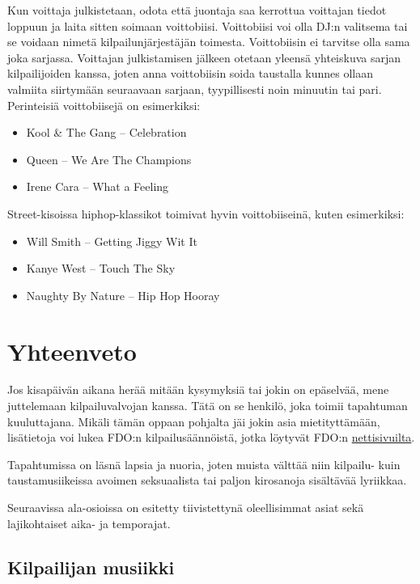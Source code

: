 \documentclass[12pt, a4paper, oneside]{article}
\begin{document}
Kun voittaja julkistetaan,
odota että juontaja saa kerrottua voittajan tiedot loppuun ja laita sitten soimaan voittobiisi.
Voittobiisi voi olla DJ:n valitsema tai se voidaan nimetä kilpailunjärjestäjän toimesta.
Voittobiisin ei tarvitse olla sama joka sarjassa.
Voittajan julkistamisen jälkeen otetaan yleensä yhteiskuva sarjan kilpailijoiden kanssa,
joten anna voittobiisin soida taustalla kunnes ollaan valmiita siirtymään seuraavaan sarjaan,
tyypillisesti noin minuutin tai pari.
Perinteisiä voittobiisejä on esimerkiksi:
\begin{itemize}[nosep]
    \item Kool \& The Gang -- Celebration
    \item Queen -- We Are The Champions
    \item Irene Cara -- What a Feeling
\end{itemize}

Street-kisoissa hiphop-klassikot toimivat hyvin voittobiiseinä,
kuten esimerkiksi:
\begin{itemize}[nosep]
    \item Will Smith -- Getting Jiggy Wit It
    \item Kanye West -- Touch The Sky
    \item Naughty By Nature -- Hip Hop Hooray
\end{itemize}

\section{Yhteenveto} \label{yhteenveto}

Jos kisapäivän aikana herää mitään kysymyksiä tai jokin on epäselvää,
mene juttelemaan kilpailuvalvojan kanssa.
Tätä on se henkilö,
joka toimii tapahtuman kuuluttajana.
Mikäli tämän oppaan pohjalta jäi jokin asia mietityttämään,
lisätietoja voi lukea FDO:n kilpailusäännöistä,
jotka löytyvät FDO:n \href{https://fdo.fi/kilpailut/}{nettisivuilta}.

Tapahtumissa on läsnä lapsia ja nuoria,
joten muista välttää niin kilpailu- kuin taustamusiikeissa avoimen seksuaalista tai paljon kirosanoja sisältävää lyriikkaa.

Seuraavissa ala-osioissa on esitetty tiivistettynä oleellisimmat asiat sekä lajikohtaiset aika- ja temporajat.

\subsection{Kilpailijan musiikki}
\end{document}
